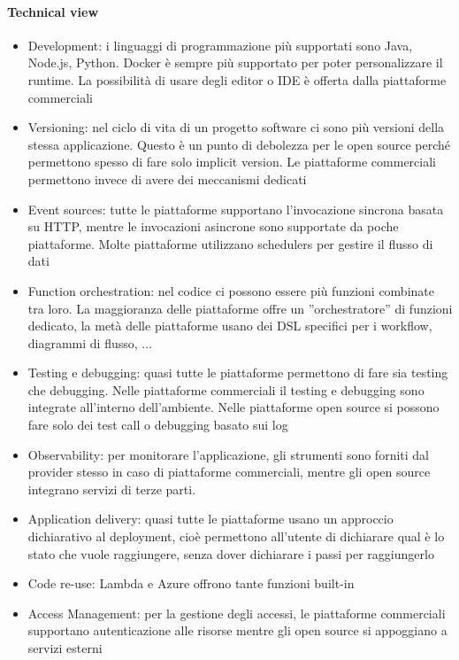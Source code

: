 \paragraph{Technical view}
\begin{itemize}
    \item Development: i linguaggi di programmazione più supportati sono Java, Node.js, Python. Docker è sempre più supportato per poter personalizzare il runtime. La possibilità di usare degli editor o IDE è offerta dalla piattaforme commerciali
    \item Versioning: nel ciclo di vita di un progetto software ci sono più versioni della stessa applicazione. Questo è un punto di debolezza per le open source perché permettono spesso di fare solo implicit version. Le piattaforme commerciali permettono invece di avere dei meccanismi dedicati
    \item Event sources: tutte le piattaforme supportano l’invocazione sincrona basata su HTTP, mentre le invocazioni asincrone sono supportate da poche piattaforme. Molte piattaforme utilizzano schedulers per gestire il flusso di dati
    \item Function orchestration: nel codice ci possono essere più funzioni combinate tra loro. La maggioranza delle piattaforme offre un ”orchestratore” di funzioni dedicato, la metà delle piattaforme usano dei DSL specifici per i workflow, diagrammi di flusso, ...
    \item Testing e debugging: quasi tutte le piattaforme permettono di fare sia testing che debugging. Nelle piattaforme commerciali il testing e debugging sono integrate all’interno dell’ambiente. Nelle piattaforme open source si possono fare solo dei test call o debugging basato sui log
    \item Observability: per monitorare l’applicazione, gli strumenti sono forniti dal provider stesso in caso di piattaforme commerciali, mentre gli open source integrano servizi di terze parti.
    \item Application delivery: quasi tutte le piattaforme usano un approccio dichiarativo al deployment, cioè permettono all’utente di dichiarare qual è lo stato che vuole raggiungere, senza dover dichiarare i passi per raggiungerlo
    \item Code re-use: Lambda e Azure offrono tante funzioni built-in
    \item Access Management: per la gestione degli accessi, le piattaforme commerciali supportano autenticazione alle risorse mentre gli open source si appoggiano a servizi esterni
\end{itemize}